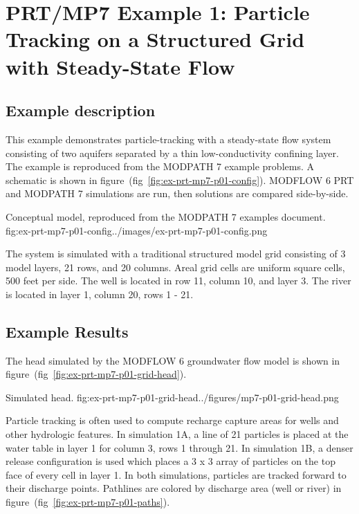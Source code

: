 \section{PRT/MP7 Example 1: Particle Tracking on a Structured Grid with Steady-State Flow}

\subsection{Example description}

This example demonstrates particle-tracking with a steady-state flow system consisting of two aquifers separated by a thin low-conductivity confining layer. The example is reproduced from the MODPATH 7 example problems. A schematic is shown in figure~(fig~\ref{fig:ex-prt-mp7-p01-config}). MODFLOW 6 PRT and MODPATH 7 simulations are run, then solutions are compared side-by-side.

\begin{StandardFigure}{
    Conceptual model, reproduced from the MODPATH 7 examples document.
    }{fig:ex-prt-mp7-p01-config}{../images/ex-prt-mp7-p01-config.png}
\end{StandardFigure}

The system is simulated with a traditional structured model grid consisting of 3 model layers, 21 rows, and 20 columns. Areal grid cells are uniform square cells, 500 feet per side. The well is located in row 11, column 10, and layer 3. The river is located in layer 1, column 20, rows 1 - 21.

\subsection{Example Results}

The head simulated by the MODFLOW 6 groundwater flow model is shown in figure~(fig~\ref{fig:ex-prt-mp7-p01-grid-head}).

\begin{StandardFigure}{
    Simulated head.
    }{fig:ex-prt-mp7-p01-grid-head}{../figures/mp7-p01-grid-head.png}
\end{StandardFigure}

Particle tracking is often used to compute recharge capture areas for wells and other hydrologic features. In simulation 1A, a line of 21 particles is placed at the water table in layer 1 for column 3, rows 1 through 21. In simulation 1B, a denser release configuration is used which places a 3 x 3 array of particles on the top face of every cell in layer 1. In both simulations, particles are tracked forward to their discharge points. Pathlines are colored by discharge area (well or river) in figure~(fig~\ref{fig:ex-prt-mp7-p01-paths}).

